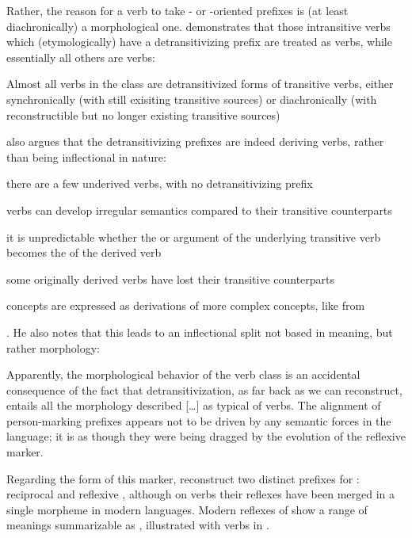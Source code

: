 Rather, the reason for a verb to take - or -oriented prefixes is (at least diachronically) a morphological one.
\textcite[217--221]{meira2000split} demonstrates that those intransitive verbs which (etymologically) have a detransitivizing prefix are treated as  verbs, while essentially all others are  verbs:
\begin{quotebox}{\parencite[201]{meira2000split}}
	Almost all verbs in the  class are detransitivized forms of transitive verbs, either synchronically (with still exisiting transitive sources) or diachronically (with reconstructible but no longer existing transitive sources)
\end{quotebox}
\textcite[221--223]{meira2000split} also argues that the detransitivizing prefixes are indeed deriving  verbs, rather than being inflectional in nature:
\begin{inlinelist}
	\item there are a few underived  verbs, with no detransitivizing prefix
	\item {} verbs can develop irregular semantics compared to their transitive counterparts
	\item it is unpredictable whether the  or  argument of the underlying transitive verb becomes the  of the derived  verb
	\item some originally derived  verbs have lost their transitive counterparts
	\item {} concepts are expressed as derivations of more complex concepts, like  from 
\end{inlinelist}.
He also notes that this leads to an inflectional split not based in meaning, but rather morphology:

\begin{quotebox}{\parencite[226]{meira2000split}}
	Apparently, the morphological behavior of the  verb class is an accidental consequence of the fact that detransitivization, as far back as we can reconstruct, entails all the morphology described […] as typical of  verbs. The alignment of person-marking prefixes appears not to be driven by any semantic forces in the language; it is as though they were being dragged by the evolution of the reflexive marker.
\end{quotebox}

Regarding the form of this marker, \textcite[505--512]{meira2010origin} reconstruct two distinct prefixes for \PC: reciprocal  and reflexive , although on verbs their reflexes have been merged in a single morpheme in modern languages.
Modern reflexes of \detrz show a range of meanings summarizable as , illustrated with \trio {} verbs in .

